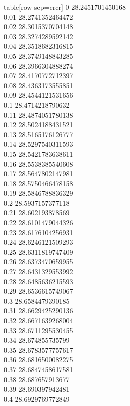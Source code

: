   table[row sep=crcr]{%
0	28.2451701450168\\
0.01	28.2741352464472\\
0.02	28.3015370704148\\
0.03	28.3274289592142\\
0.04	28.3518682316815\\
0.05	28.3749148843285\\
0.06	28.3966304888274\\
0.07	28.4170772712397\\
0.08	28.4363173555851\\
0.09	28.4544121531656\\
0.1	28.4714218790632\\
0.11	28.4874051780138\\
0.12	28.5024188431521\\
0.13	28.5165176126777\\
0.14	28.5297540311593\\
0.15	28.5421783638611\\
0.16	28.5538385540608\\
0.17	28.5647802147981\\
0.18	28.5750466478158\\
0.19	28.5846788836329\\
0.2	28.5937157377118\\
0.21	28.602193878569\\
0.22	28.6101479044326\\
0.23	28.6176104256931\\
0.24	28.6246121509293\\
0.25	28.6311819747409\\
0.26	28.6373470659955\\
0.27	28.6431329553992\\
0.28	28.6485636215593\\
0.29	28.6536615749067\\
0.3	28.6584479390185\\
0.31	28.6629425290136\\
0.32	28.6671639268004\\
0.33	28.6711295530455\\
0.34	28.674855735799\\
0.35	28.6783577757617\\
0.36	28.6816500082275\\
0.37	28.6847458617581\\
0.38	28.687657913677\\
0.39	28.690397942481\\
0.4	28.6929769772849\\
}
